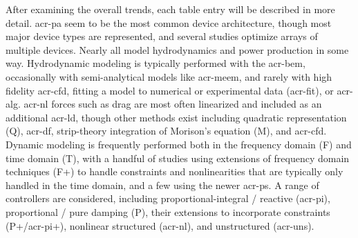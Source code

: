 \ifdefined\DISSERTATION
    After examining the overall trends, each table entry will be described in more detail.
    \Acrfull{acr-pa} seem to be the most common device architecture, though most major device types are represented, and several studies optimize arrays of multiple devices.
    Nearly all model hydrodynamics and power production in some way.
    Hydrodynamic modeling is typically performed with the \acrfull{acr-bem}, occasionally with semi-analytical models like \acrfull{acr-meem}, and rarely with high fidelity \acrfull{acr-cfd}, fitting a model to numerical or experimental data (\acrshort{acr-fit}), or \acrfull{acr-alg}.
    \gls{acr-nl} forces such as drag are most often linearized and included as an additional \acrfull{acr-ld}, though other methods exist including quadratic representation (Q), \acrfull{acr-df}, strip-theory integration of Morison's equation (M), and \acrfull{acr-cfd}.
    Dynamic modeling is frequently performed both in the frequency domain (F) and time domain (T), with a handful of studies using extensions of frequency domain techniques (F+) to handle constraints and nonlinearities that are typically only handled in the time domain, and a few using the newer \acrfull{acr-ps}.
    A range of controllers are considered, including proportional-integral / reactive (\gls{acr-pi}), proportional / pure damping (P), their extensions to incorporate constraints (P+/\gls{acr-pi}+), nonlinear structured (\acrshort{acr-nl}), and unstructured (\acrshort{acr-uns}).

